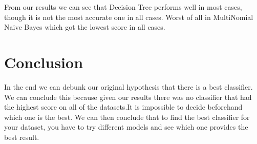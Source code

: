 \documentclass{article}
\begin{document}
From our results we can see that Decision Tree performs well in most cases, though it is not the most accurate one in all cases. Worst of all in MultiNomial Naive Bayes which got the lowest score in all cases.

\section{Conclusion}
In the end we can debunk our original hypothesis that there is a best classifier. We can conclude this because given our results there was no classifier that had the highest score on all of the datasets.It is impossible to decide beforehand which one is the best. We can then conclude that to find  the best classifier for your dataset, you have to try different models and see which one provides the best result.
\end{document}
